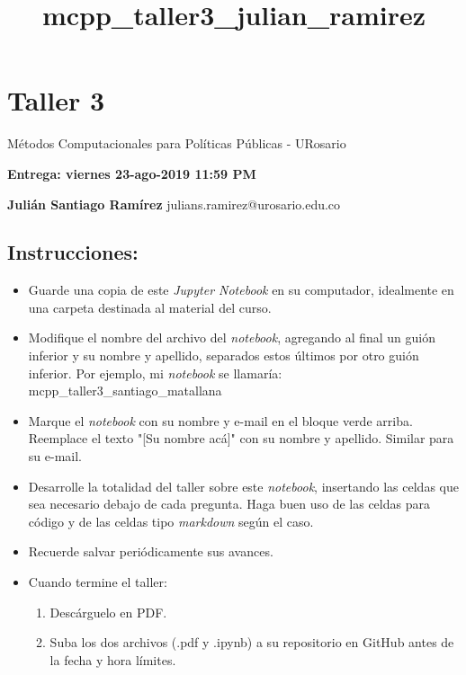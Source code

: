 \documentclass[11pt]{article}
\title{mcpp\_taller3\_julian\_ramirez}
\providecommand{\tightlist}{%
      \setlength{\itemsep}{0pt}\setlength{\parskip}{0pt}}
\begin{document}
    
    
    \maketitle
    
    

    
    \section{Taller 3}\label{taller-3}

Métodos Computacionales para Políticas Públicas - URosario

\textbf{Entrega: viernes 23-ago-2019 11:59 PM}

    \textbf{Julián Santiago Ramírez} julians.ramirez@urosario.edu.co

    \subsection{Instrucciones:}\label{instrucciones}

\begin{itemize}
\tightlist
\item
  Guarde una copia de este \emph{Jupyter Notebook} en su computador,
  idealmente en una carpeta destinada al material del curso.
\item
  Modifique el nombre del archivo del \emph{notebook}, agregando al
  final un guión inferior y su nombre y apellido, separados estos
  últimos por otro guión inferior. Por ejemplo, mi \emph{notebook} se
  llamaría: mcpp\_taller3\_santiago\_matallana
\item
  Marque el \emph{notebook} con su nombre y e-mail en el bloque verde
  arriba. Reemplace el texto "{[}Su nombre acá{]}" con su nombre y
  apellido. Similar para su e-mail.
\item
  Desarrolle la totalidad del taller sobre este \emph{notebook},
  insertando las celdas que sea necesario debajo de cada pregunta. Haga
  buen uso de las celdas para código y de las celdas tipo
  \emph{markdown} según el caso.
\item
  Recuerde salvar periódicamente sus avances.
\item
  Cuando termine el taller:

  \begin{enumerate}
  \def\labelenumi{\arabic{enumi}.}
  \tightlist
  \item
    Descárguelo en PDF.
  \item
    Suba los dos archivos (.pdf y .ipynb) a su repositorio en GitHub
    antes de la fecha y hora límites.
  \end{enumerate}
\end{itemize}
\end{document}

